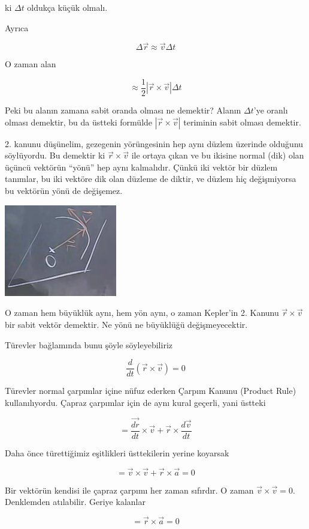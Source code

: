 \documentclass[12pt,fleqn]{article}\usepackage{../../common}
\begin{document}
ki $\Delta t$ oldukça küçük olmalı. 

Ayrıca

$$ \Delta \vec{r} \approx \vec{v} \Delta t $$

O zaman alan

$$ \approx
\frac{1}{2} |\vec{r} \times \vec{v}| \Delta t
 $$

Peki bu alanın zamana sabit oranda olması ne demektir? Alanın $\Delta t$'ye
oranlı olması demektir, bu da üstteki formülde $|\vec{r} \times \vec{v}|$
teriminin sabit olması demektir.

2. kanunu düşünelim, gezegenin yörüngesinin hep aynı düzlem üzerinde olduğunu
söylüyordu. Bu demektir ki $\vec{r} \times \vec{v}$ ile ortaya çıkan ve bu
ikisine normal (dik) olan üçüncü vektörün ``yönü'' hep aynı kalmalıdır. Çünkü
iki vektör bir düzlem tanımlar, bu iki vektöre dik olan düzleme de diktir, ve
düzlem hiç değişmiyorsa bu vektörün yönü de değişemez.

\includegraphics[height=4cm]{6_8.png}

O zaman hem büyüklük aynı, hem yön aynı, o zaman Kepler'in 2. Kanunu $\vec{r}
\times \vec{v}$ bir sabit vektör demektir. Ne yönü ne büyüklüğü değişmeyecektir.

Türevler bağlamında bunu şöyle söyleyebiliriz

$$ \frac{d}{dt}(\vec{r} \times \vec{v}) = 0 $$

Türevler normal çarpımlar içine nüfuz ederken Çarpım Kanunu (Product Rule)
kullanılıyordu. Çapraz çarpımlar için de aynı kural geçerli, yani üstteki

$$ = \frac{\vec{dr}}{dt} \times \vec{v} + \vec{r} \times \frac{d\vec{v}}{dt} $$

Daha önce türettiğimiz eşitlikleri üsttekilerin yerine koyarsak

$$ =\vec{v} \times \vec{v} + \vec{r} \times \vec{a} = 0$$

Bir vektörün kendisi ile çapraz çarpımı her zaman sıfırdır. O zaman $\vec{v}
\times \vec{v} = 0$. Denklemden atılabilir. Geriye kalanlar

$$ = \vec{r} \times \vec{a} = 0$$
\end{document}
